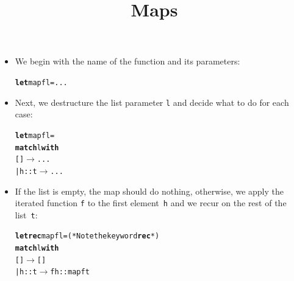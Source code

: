\documentclass[wide]{slides}
\begin{document}
\begin{slide}
  \title{Maps}

  \begin{itemize}

    \item We begin with the name of the function and its parameters:
      \smallskip
\begin{alltt}
\textbf{let} map f l = ...
\end{alltt}

    \item Next, we destructure the list parameter \texttt{l} and
      decide what to do for each case:
      \smallskip
\begin{alltt}
\textbf{let} map f l =
  \textbf{match} l \textbf{with}
       [] \(\rightarrow\) ...
  | h::t \(\rightarrow\) ...
\end{alltt}

  \item If the list is empty, the map should do nothing, otherwise, we
    apply the iterated function \texttt{f} to the first
    element~\texttt{h} and we recur on the rest of the
    list~\texttt{t}:
      \smallskip
\begin{alltt}
\textbf{let rec} map f l = (* Note the keyword \textbf{rec} *)
  \textbf{match} l \textbf{with}
       [] \(\rightarrow\) []
  | h::t \(\rightarrow\) f h :: map f t
\end{alltt}

  \end{itemize}

\end{slide}
\end{document}
